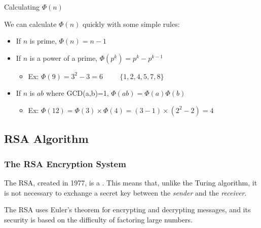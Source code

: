 

\begin{frame}{Calculating $\Phi(n)$}

  We can calculate $\Phi(n)$ quickly with some simple rules:\bigskip

  \begin{itemize}
  \item If $n$ is prime, $\Phi(n) = n-1$\bigskip

  \item If $n$ is a power of a prime, $\Phi(p^k) = p^k - p^{k-1}$
    \begin{itemize}
    \item Ex: $\Phi(9) = 3^2 - 3 = 6 \hspace{1cm} \{1,2,4,5,7,8\}$
    \end{itemize}\bigskip

  \item If $n$ is $ab$ where GCD(a,b)=1, $\Phi(ab) = \Phi(a)\Phi(b)$
    \begin{itemize}
    \item Ex: $\Phi(12) = \Phi(3) \times \Phi(4) = (3-1)\times (2^2 - 2) = 4$
    \end{itemize}
  \end{itemize}
\end{frame}


\subsection{RSA Algorithm}
\begin{frame}
  \frametitle{The RSA Encryption System}

  The RSA, created in 1977, is a . This means that, unlike the Turing algorithm, it is not necessary to exchange a secret key between the \emph{sender} and the \emph{receiver}.\bigskip

  The RSA uses Euler's theorem for encrypting and decrypting messages, and its security is based on the difficulty of factoring large numbers.
\end{frame}

